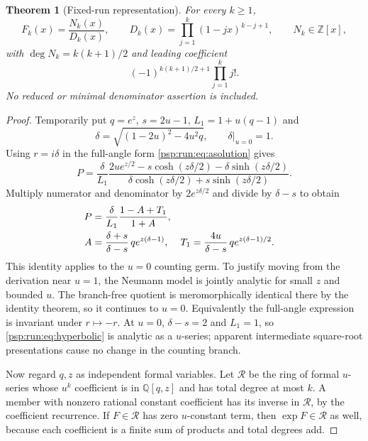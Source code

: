 \documentclass[11pt,letterpaper]{article}
\numberwithin{equation}{section}
\newtheorem{theorem}{Theorem}[section]
\theoremstyle{remark}\newtheorem{remark}[theorem]{Remark}
\newcommand{\QQ}{\mathbb Q}
\begin{document}
\begin{theorem}[Fixed-run representation]\label{psp:run:thm:fixed}
For every $k\geq1$,
\begin{equation}\label{psp:run:eq:fixeddenominator}
 F_k(x)=\frac{N_k(x)}{D_k(x)},\qquad
 D_k(x)=\prod_{j=1}^k(1-jx)^{k-j+1},\qquad N_k\in\mathbb Z[x],
\end{equation}
with $\deg N_k=k(k+1)/2$ and leading coefficient
\[
 (-1)^{k(k+1)/2+1}\prod_{j=1}^k j!.
\]
No reduced or minimal denominator assertion is included.
\end{theorem}
\begin{proof}
Temporarily put $q=e^z$, $s=2u-1$, $L_1=1+u(q-1)$ and
\[
 \delta=\sqrt{(1-2u)^2-4u^2q},\qquad \delta|_{u=0}=1.
\]
Using $r=i\delta$ in the full-angle form \eqref{psp:run:eq:asolution} gives
\[
 P=\frac\delta{L_1}
 \frac{2ue^{z/2}-s\cosh(z\delta/2)-\delta\sinh(z\delta/2)}
      {\delta\cosh(z\delta/2)+s\sinh(z\delta/2)}.
\]
Multiply numerator and denominator by $2e^{z\delta/2}$ and divide by
$\delta-s$ to obtain
\begin{align}
 P&=\frac\delta{L_1}\frac{1-A+T_1}{1+A},\notag\\
 A&=\frac{\delta+s}{\delta-s}\,q e^{z(\delta-1)},&
 T_1&=\frac{4u}{\delta-s}\,q e^{z(\delta-1)/2}.\label{psp:run:eq:hyperbolic}
\end{align}
This identity applies to the $u=0$ counting germ. To justify moving
from the derivation near $u=1$, the Neumann model is jointly analytic
for small $z$ and bounded $u$. The branch-free quotient is meromorphically
identical there by the identity theorem, so it continues to $u=0$.
Equivalently the full-angle expression is invariant under $r\mapsto-r$.
At $u=0$, $\delta-s=2$ and $L_1=1$, so \eqref{psp:run:eq:hyperbolic} is analytic
as a $u$-series; apparent intermediate square-root presentations cause
no change in the counting branch.

Now regard $q,z$ as independent formal variables. Let $\mathcal R$ be
the ring of formal $u$-series whose $u^k$ coefficient is in $\QQ[q,z]$
and has total degree at most $k$. A member with nonzero rational
constant coefficient has its inverse in $\mathcal R$, by the coefficient
recurrence. If $F\in\mathcal R$ has zero $u$-constant term, then
$\exp F\in\mathcal R$ as well, because each coefficient is a finite sum
of products and total degrees add.


\end{proof}
\end{document}
